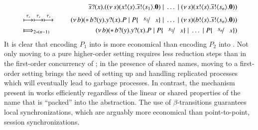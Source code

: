\documentclass[runningheads]{llncs}
\begin{document}
{\begin{eqnarray*}
& & \qquad \qquad \binp{\dual{s}}{x} (\newsp{s}{\bout{x}{s} \bout{\dual{s}}{s_1} \inact} \Par \dots \Par \newsp{s}{\bout{x}{s} \bout{\dual{s}}{s_n}\inact})
	\\
	& \hby{\stau}  \hby{\stau} \hby{\stau} & 
	\newsp{b}{\repl \binp{b}{y} \binp{y}{x} P \Par P\subst{s_1}{x} \Par \dots \Par \newsp{s}{\bout{b}{s} \bout{\dual{s}}{s_n} \inact}}
	\\
	& \Hby{}_{2*(n - 1)} & 
	\newsp{b}{\repl \binp{b}{y} \binp{y}{x} P \Par P\subst{s_1}{x} \Par \dots \Par P\subst{s_n}{x}}
\end{eqnarray*}
\noi 
It is clear that encoding $P_1$ into \HO is more economical than 
encoding $P_2$ into \sessp. Not only moving to a pure higher-order setting requires less reduction steps than in the first-order concurrency of \sessp; in the presence of shared names, moving to a first-order setting brings the need of setting up and handling replicated processes which will eventually lead to garbage processes. In contrast, the mechanism present in \HO works efficiently regardless of the linear or shared properties of the name that is ``packed'' into the abstraction. 
The use of $\beta$-transitions guarantees local synchronizations, which are arguably more economical than point-to-point, session synchronizations.

}
\end{document}
